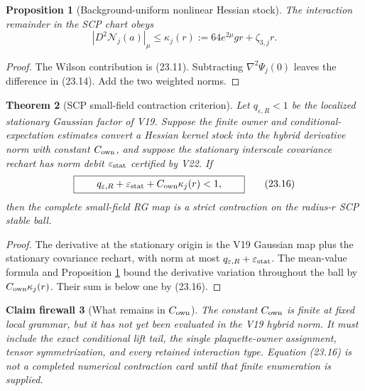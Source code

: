 \documentclass[11pt,oneside]{book}
\newtheorem{theorem}{Theorem}[chapter]
\newtheorem{proposition}[theorem]{Proposition}
\newtheorem{firewall}[theorem]{Claim firewall}
\theoremstyle{definition}
\theoremstyle{remark}
\begin{document}
\begin{proposition}[Background-uniform nonlinear Hessian stock]
\label{prop:e8v23-nonlinear-stock}
The interaction remainder in the SCP chart obeys
\[
\boxed{\qquad
 |D^2\mathcal N_j(a)|_\mu
 \leq\kappa_j(r):=
       64e^{2\mu}gr+\zeta_{3,j}r.
\qquad}                                                           \tag{23.15}
\]
\end{proposition}

\begin{proof}
The Wilson contribution is (23.11).  Subtracting
\(\nabla^2\Psi_j(0)\) leaves the difference in (23.14).  Add the two
weighted norms.
\end{proof}

\begin{theorem}[SCP small-field contraction criterion]
\label{thm:e8v23-contraction}
Let \(q_{\varepsilon,R}<1\) be the localized stationary Gaussian
factor of V19.  Suppose the finite owner and conditional-expectation
estimates convert a Hessian kernel stock into the hybrid derivative
norm with constant \(C_{\rm own}\), and suppose the stationary
interscale covariance rechart has norm debit
\(\varepsilon_{\rm stat}\) certified by V22.  If
\[
\boxed{\qquad
 q_{\varepsilon,R}
 +\varepsilon_{\rm stat}
 +C_{\rm own}\kappa_j(r)<1,
\qquad}                                                           \tag{23.16}
\]
then the complete small-field RG map is a strict contraction on the
radius-\(r\) SCP stable ball.
\end{theorem}

\begin{proof}
The derivative at the stationary origin is the V19 Gaussian map plus
the stationary covariance rechart, with norm at most
\(q_{\varepsilon,R}+\varepsilon_{\rm stat}\).
The mean-value formula and Proposition
\ref{prop:e8v23-nonlinear-stock} bound the derivative variation
throughout the ball by \(C_{\rm own}\kappa_j(r)\).
Their sum is below one by (23.16).
\end{proof}

\begin{firewall}[What remains in \(C_{\rm own}\)]
\label{fire:e8v23-owner}
The constant \(C_{\rm own}\) is finite at fixed local grammar, but it
has not yet been evaluated in the V19 hybrid norm.  It must include
the exact conditional lift tail, the single plaquette-owner
assignment, tensor symmetrization, and every retained interaction
type.  Equation (23.16) is not a completed numerical contraction card
until that finite enumeration is supplied.
\end{firewall}
\end{document}
